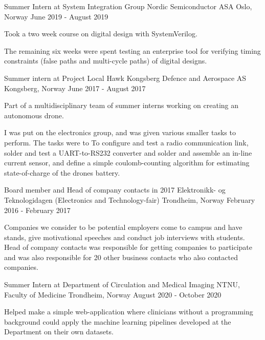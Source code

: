         \cventry
        {Summer Intern at System Integration Group}
        {Nordic Semiconductor ASA}
        {Oslo, Norway}
        {June 2019 - August 2019}
        {      
          \begin{cvitems}
            \item {Took a two week course on digital design with SystemVerilog.}
            \item {The remaining six weeks were spent testing an enterprise tool for verifying timing constraints (false paths and multi-cycle paths) of digital designs.}
          \end{cvitems}
        }
        \cventry
        {Summer intern at Project Local Hawk}
        {Kongsberg Defence and Aerospace AS}
        {Kongsberg, Norway}
        {June 2017 - August 2017}
        {      
          \begin{cvitems}
            \item {Part of a multidisciplinary team of summer interns working on creating an autonomous drone.}
            \item {I was put on the electronics group, and was given various smaller tasks to perform. The tasks were to To configure and test a radio communication link, solder and test a UART-to-RS232 converter and solder and assemble an in-line current sensor, and define a simple coulomb-counting algorithm for estimating state-of-charge of the drones battery.}
          \end{cvitems}
        }
    \cventry
        {Board member and Head of company contacts in 2017}
        {Elektronikk- og Teknologidagen (Electronics and Technology-fair)}
        {Trondheim, Norway}
        {February 2016 - February 2017}
        {
          \begin{cvitems}
            \item {Companies we consider to be potential employers come to campus and have stands, give motivational speeches and conduct job interviews with students. Head of company contacts was responsible for getting companies to participate and was also responsible for 20 other business contacts who also contacted companies.}
          \end{cvitems}
        }
    \cventry
        {Summer Intern at Department of Circulation and Medical Imaging}
        {NTNU, Faculty of Medicine}
        {Trondheim, Norway}
        {August 2020 - October 2020}
        {      
          \begin{cvitems}
            \item {Helped make a simple web-application where clinicians without a programming background could apply the machine learning pipelines developed at the Department on their own datasets.}
          \end{cvitems}
        }
